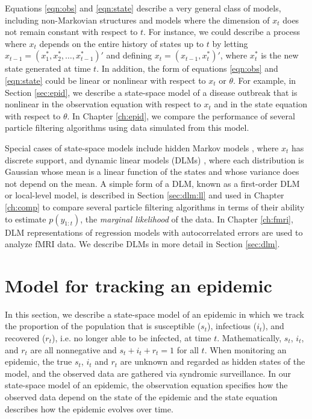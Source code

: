 Equations \eqref{eqn:obs} and \eqref{eqn:state} describe a very general class of models, including non-Markovian structures and models where the dimension of $x_t$ does not remain constant with respect to $t$. For instance, we could describe a process where $x_t$ depends on the entire history of states up to $t$ by letting $x_{t-1} = (x^*_1, x^*_2, \ldots, x^*_{t-1})'$ and defining $x_t = (x_{t-1}, x^*_t)'$, where $x^*_t$ is the new state generated at time $t$. In addition, the form of equations \eqref{eqn:obs} and \eqref{eqn:state} could be linear or nonlinear with respect to $x_t$ or $\theta$. For example, in Section \ref{sec:epid}, we describe a state-space model of a disease outbreak that is nonlinear in the observation equation with respect to $x_t$ and in the state equation with respect to $\theta$. In Chapter \ref{ch:epid}, we compare the performance of several particle filtering algorithms using data simulated from this model.

Special cases of state-space models include hidden Markov models \citep{cappe:2005:inference}, where $x_t$ has discrete support, and dynamic linear models (DLMs) \citep{West:Harr:baye:1997, petris:camp:2009:dynamic}, where each distribution is Gaussian whose mean is a linear function of the states and whose variance does not depend on the mean. A simple form of a DLM, known as a first-order DLM or local-level model, is described in Section \ref{sec:dlm:ll} and used in Chapter \ref{ch:comp} to compare several particle filtering algorithms in terms of their ability to estimate $p(y_{1:t})$, the \emph{marginal likelihood} of the data. In Chapter \ref{ch:fmri}, DLM representations of regression models with autocorrelated errors are used to analyze fMRI data. We describe DLMs in more detail in Section \ref{sec:dlm}.

\section{Model for tracking an epidemic \label{sec:epid}}

In this section, we describe a state-space model of an epidemic in which we track the proportion of the population that is susceptible ($s_t$), infectious ($i_t$), and recovered ($r_t$), i.e. no longer able to be infected, at time $t$. Mathematically, $s_t$, $i_t$, and $r_t$ are all nonnegative and $s_t + i_t + r_t = 1$ for all $t$. When monitoring an epidemic, the true $s_t$, $i_t$ and $r_t$ are unknown and regarded as hidden states of the model, and the observed data are gathered via syndromic surveillance. In our state-space model of an epidemic, the observation equation specifies how the observed data depend on the state of the epidemic and the state equation describes how the epidemic evolves over time.

